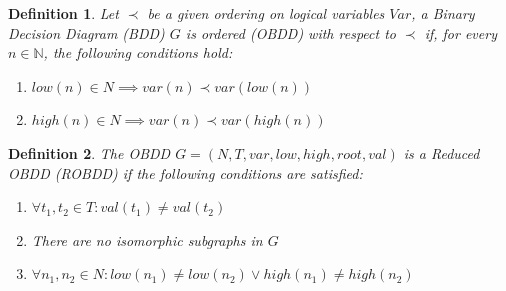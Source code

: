 \documentclass[pdflatex,sn-mathphys-num]{sn-jnl}%
\theoremstyle{thmstyleone}%
\theoremstyle{thmstyletwo}%
\theoremstyle{thmstylethree}%
\newtheorem{definition}{Definition}%
\begin{document}
        \vspace*{0.5em}

        \begin{definition}
            Let $\prec$ be a given ordering on logical variables $V\!ar$, a Binary Decision Diagram (BDD) $G$ is ordered (OBDD) with respect to $\prec$ if, for every $n \in \mathbb{N}$, the following conditions hold:
            \begin{enumerate}[noindent]
                \item $low(n) \in N \implies var(n) \prec var(low(n))$
                \item $high(n) \in N \implies var(n) \prec var(high(n))$
            \end{enumerate}
        \end{definition}

        \begin{definition}
            The OBDD $G = (N, T, var, low, high, root, val)$ is a Reduced OBDD (ROBDD) if the following conditions are satisfied:
            \begin{enumerate}[noindent]
                \item $\forall t_1, t_2 \in T : val(t_1) \neq val(t_2)$
                \item There are no isomorphic subgraphs in $G$
                \item $\forall n_1, n_2 \in N : low(n_1) \neq low(n_2) \lor high(n_1) \neq high(n_2)$
            \end{enumerate}
        \end{definition}
\end{document}
